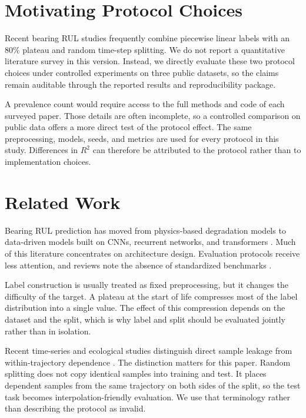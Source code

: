 \documentclass[5p,twocolumn]{elsarticle}
\begin{document}
\section{Motivating Protocol Choices}
Recent bearing RUL studies frequently combine piecewise linear labels with an 80\% plateau and random time-step splitting. We do not report a quantitative literature survey in this version. Instead, we directly evaluate these two protocol choices under controlled experiments on three public datasets, so the claims remain auditable through the reported results and reproducibility package.

A prevalence count would require access to the full methods and code of each surveyed paper. Those details are often incomplete, so a controlled comparison on public data offers a more direct test of the protocol effect. The same preprocessing, models, seeds, and metrics are used for every protocol in this study. Differences in $R^2$ can therefore be attributed to the protocol rather than to implementation choices.

\section{Related Work}
Bearing RUL prediction has moved from physics-based degradation models to data-driven models built on CNNs, recurrent networks, and transformers \cite{rul_lstm_uq_2022,reg_lstm_2021,transformer_tim_2023}. Much of this literature concentrates on architecture design. Evaluation protocols receive less attention, and reviews note the absence of standardized benchmarks \cite{zhao2021deep,caesarendra2021machine}.

Label construction is usually treated as fixed preprocessing, but it changes the difficulty of the target. A plateau at the start of life compresses most of the label distribution into a single value. The effect of this compression depends on the dataset and the split, which is why label and split should be evaluated jointly rather than in isolation.

Recent time-series and ecological studies distinguish direct sample leakage from within-trajectory dependence \cite{leakage_nature,leakage_frontiers}. The distinction matters for this paper. Random splitting does not copy identical samples into training and test. It places dependent samples from the same trajectory on both sides of the split, so the test task becomes interpolation-friendly evaluation. We use that terminology rather than describing the protocol as invalid.
\end{document}
